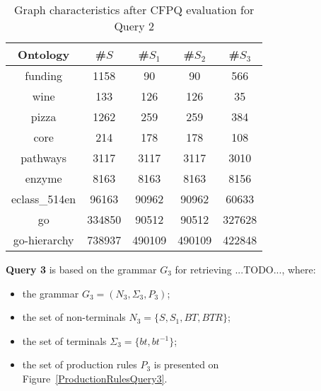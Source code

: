 \begin{table*}[ht]
	\centering
	\caption{Graph characteristics after CFPQ evaluation for Query 2}
	\label{tbl6}
	
	\begin{tabular}{ | c | c | c | c | c |}
		\hline
		Ontology & \#$S$ & \#$S_1$ & \#$S_2$ & \#$S_3$\\
		\hline 
		\hline
		funding        & 1158 & 90 & 90 & 566\\
		wine           & 133 & 126 & 126 & 35\\
		pizza          & 1262 & 259 & 259 & 384\\
		core           & 214 & 178 & 178 & 108\\
		pathways       & 3117 & 3117 & 3117 & 3010\\
		enzyme         & 8163 & 8163 & 8163 & 8156\\
		eclass\_514en  & 96163 & 90962 & 90962 & 60633\\
		go             & 334850 & 90512 & 90512 & 327628\\
		go-hierarchy   & 738937 & 490109 & 490109 & 422848\\
		\hline
	\end{tabular}
	
\end{table*}




\textbf{Query 3} is based on the grammar $G_3$ for retrieving ...TODO..., where:
\begin{itemize}
	\item the grammar $G_3 = (N_3, \Sigma_3, P_3)$;
	\item the set of non-terminals $N_3 = \{S, S_1, BT, BTR\}$;
	\item the set of terminals $\Sigma_3 = \{bt, bt^{-1}\}$;
	\item the set of production rules $P_3$ is presented on Figure~\ref{ProductionRulesQuery3}.
\end{itemize}

